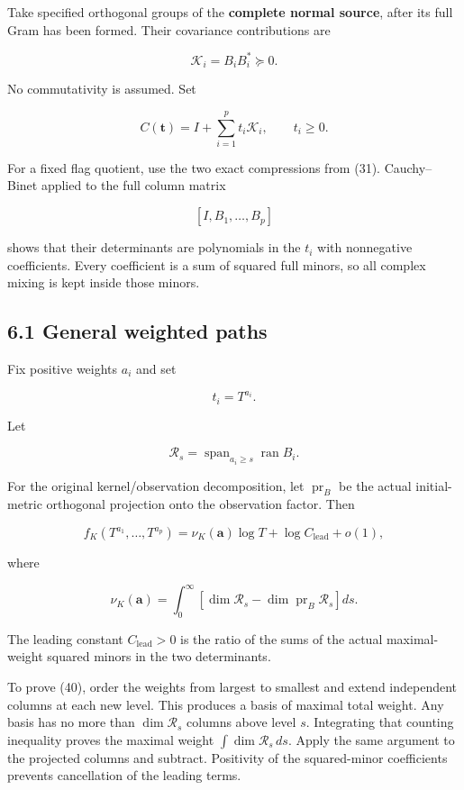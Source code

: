 \documentclass[11pt]{article}
\begin{document}
Take specified orthogonal groups of the \textbf{complete normal source}, after its full Gram has been formed. Their covariance contributions are

\[
\mathcal K_i=B_iB_i^*\succeq0.
\]

No commutativity is assumed. Set

\[
C(\mathbf t)=I+\sum_{i=1}^p t_i\mathcal K_i,
\qquad t_i\ge0.
\]

For a fixed flag quotient, use the two exact compressions from (31). Cauchy--Binet applied to the full column matrix

\[
[I,B_1,\ldots,B_p]
\]

shows that their determinants are polynomials in the \(t_i\) with nonnegative coefficients. Every coefficient is a sum of squared full minors, so all complex mixing is kept inside those minors.

\subsection{6.1 General weighted paths}\label{general-weighted-paths}

Fix positive weights \(a_i\) and set

\[
t_i=T^{a_i}.
\]

Let

\[
\mathscr R_s
=
\operatorname{span}_{a_i\ge s}\operatorname{ran}B_i.
\]

For the original kernel/observation decomposition, let \(\operatorname{pr}_B\) be the actual initial-metric orthogonal projection onto the observation factor. Then

\[
\boxed{
f_K(T^{a_1},\ldots,T^{a_p})
=
\nu_K(\mathbf a)\log T+\log C_{\mathrm{lead}}+o(1),
}
\tag{39}
\]

where

\[
\boxed{
\nu_K(\mathbf a)
=
\int_0^\infty
\left[
\dim\mathscr R_s
-\dim\operatorname{pr}_B\mathscr R_s
\right]ds.
}
\tag{40}
\]

The leading constant \(C_{\mathrm{lead}}>0\) is the ratio of the sums of the actual maximal-weight squared minors in the two determinants.

To prove (40), order the weights from largest to smallest and extend independent columns at each new level. This produces a basis of maximal total weight. Any basis has no more than \(\dim\mathscr R_s\) columns above level \(s\). Integrating that counting inequality proves the maximal weight \(\int\dim\mathscr R_s\,ds\). Apply the same argument to the projected columns and subtract. Positivity of the squared-minor coefficients prevents cancellation of the leading terms.
\end{document}
